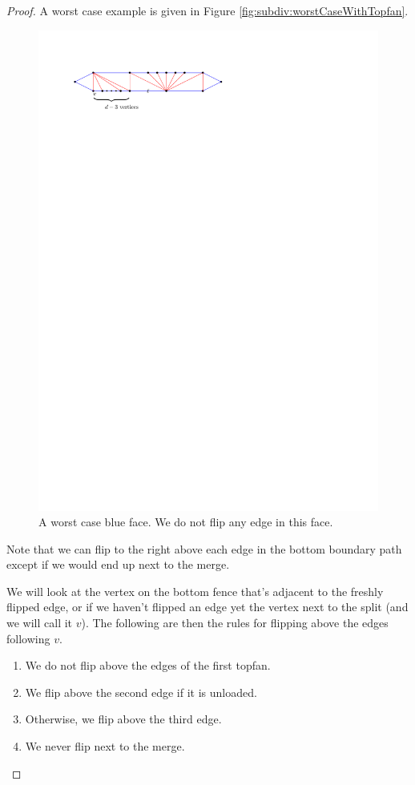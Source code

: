   \begin{proof}
  A worst case example is given in Figure \ref{fig:subdiv:worstCaseWithTopfan}.

  \begin{figure}[h]
    \centering
    \includegraphics[scale=1]{blueFaceSubdivision/img/worstCaseWithTopFan}
    \caption{A worst case blue face. We do not flip any edge in this face.}
    \label{fig:subdiv:worstCaseWithTopFan}
  \end{figure}

  Note that we can flip to the right above each edge in the bottom boundary path except if we would end up next to the merge.

  We will look at the vertex on the bottom fence that's adjacent to the freshly flipped edge, or if we haven't flipped an edge yet the vertex next to the split (and we will call it $v$). The following are then the rules for flipping above the edges following $v$.
  \begin{enumerate}
    \item We do not flip above the edges of the first topfan.
    \item We flip above the second edge if it is unloaded.
    \item Otherwise, we flip above the third edge.
    \item We never flip next to the merge.
  \end{enumerate}


\end{proof}
